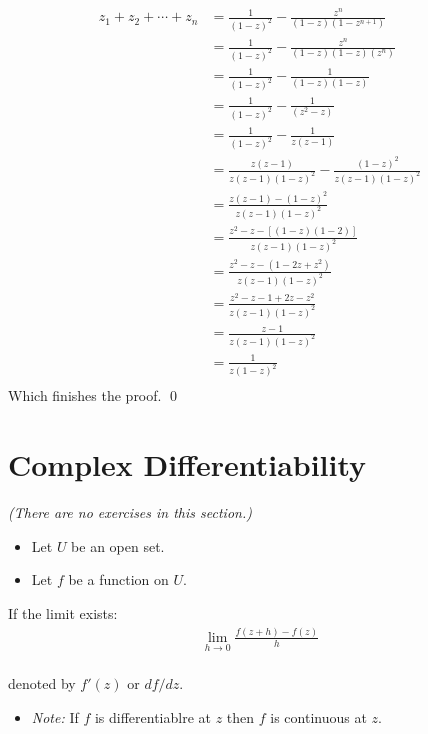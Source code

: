\begin{enumerate}
		\begin{align*}
		z_1 + z_2 + \cdots + z_n &= \frac{1}{(1 - z)^2} - \frac{z^n}{(1 - z)(1 - z^{n + 1})} \\
		&= \frac{1}{(1 - z)^2} - \frac{z^n}{(1 - z)(1 - z)(z^n)} \\
		&= \frac{1}{(1 - z)^2} - \frac{1}{(1 - z)(1 - z)} \\
		&= \frac{1}{(1 - z)^2} - \frac{1}{(z^2 - z)} \\
		&= \frac{1}{(1 - z)^2} - \frac{1}{z(z - 1)} \\
		&= \frac{z(z - 1)}{z(z - 1)(1 - z)^2} - \frac{(1 - z)^2}{z(z - 1)(1 - z)^2} \\
		&= \frac{z(z - 1) - (1 - z)^2}{z(z - 1)(1 - z)^2} \\
		&= \frac{z^2 - z  - [(1 - z)(1 - 2)]}{z(z - 1)(1 - z)^2} \\
		&= \frac{z^2 - z  - (1 - 2z + z^2)}{z(z - 1)(1 - z)^2} \\
		&= \frac{z^2 - z  - 1 + 2z - z^2}{z(z - 1)(1 - z)^2} \\
		&= \frac{z - 1}{z(z - 1)(1 - z)^2} \\
		&= \frac{1}{z(1 - z)^2} \\
	\end{align*}
	Which finishes the proof.
	\qed

\end{enumerate}

\section{Complex Differentiability}
\textit{(There are no exercises in this section.)}
\begin{itemize}
	\item Let $U$ be an open set. 
	\item Let $f$ be a function on $U.$
\end{itemize}

\begin{defn}
	If the limit exists:
	\begin{align*}
		\lim_{h \to 0} \frac{f(z + h) - f(z)}{h} \\
	\end{align*}


	denoted by $f'(z)$ or $df/dz.$
\end{defn}
\begin{itemize}
	\item \textit{Note:} If $f$ is differentiablre at $z$ then $f$ is continuous at $z.$
\end{itemize}

